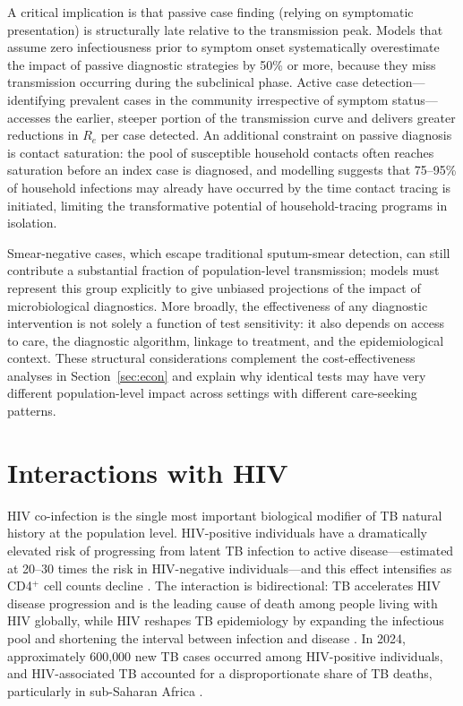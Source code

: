 \documentclass[11pt]{article}
\begin{document}
A critical implication is that passive case finding (relying on symptomatic presentation) is structurally late relative to the transmission peak. Models that assume zero infectiousness prior to symptom onset systematically overestimate the impact of passive diagnostic strategies by 50\% or more, because they miss transmission occurring during the subclinical phase. Active case detection---identifying prevalent cases in the community irrespective of symptom status---accesses the earlier, steeper portion of the transmission curve and delivers greater reductions in $R_e$ per case detected. An additional constraint on passive diagnosis is contact saturation: the pool of susceptible household contacts often reaches saturation before an index case is diagnosed, and modelling suggests that 75--95\% of household infections may already have occurred by the time contact tracing is initiated, limiting the transformative potential of household-tracing programs in isolation.

Smear-negative cases, which escape traditional sputum-smear detection, can still contribute a substantial fraction of population-level transmission; models must represent this group explicitly to give unbiased projections of the impact of microbiological diagnostics. More broadly, the effectiveness of any diagnostic intervention is not solely a function of test sensitivity: it also depends on access to care, the diagnostic algorithm, linkage to treatment, and the epidemiological context. These structural considerations complement the cost-effectiveness analyses in Section~\ref{sec:econ} and explain why identical tests may have very different population-level impact across settings with different care-seeking patterns.

\section{Interactions with HIV}
\label{sec:hiv}

HIV co-infection is the single most important biological modifier of TB natural history at the population level. HIV-positive individuals have a dramatically elevated risk of progressing from latent TB infection to active disease---estimated at 20--30 times the risk in HIV-negative individuals---and this effect intensifies as CD4$^+$ cell counts decline \citep{getahun2010hiv, lawn2011tuberculosis}. The interaction is bidirectional: TB accelerates HIV disease progression and is the leading cause of death among people living with HIV globally, while HIV reshapes TB epidemiology by expanding the infectious pool and shortening the interval between infection and disease \citep{corbett2003growing}. In 2024, approximately 600{,}000 new TB cases occurred among HIV-positive individuals, and HIV-associated TB accounted for a disproportionate share of TB deaths, particularly in sub-Saharan Africa \citep{who2025global}.
\end{document}
